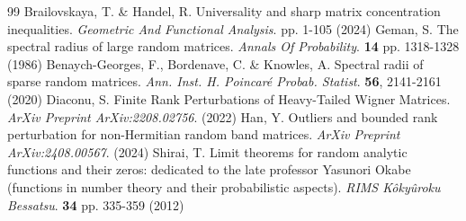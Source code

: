 \documentclass[12pt, reqno]{amsart}
\theoremstyle{definition}
\theoremstyle{remark}
\numberwithin{equation}{section}
\begin{document}
\begin{thebibliography}{99}
Brailovskaya, T. \& Handel, R. Universality and sharp matrix concentration inequalities. {\em Geometric And Functional Analysis}. pp. 1-105 (2024)
Geman, S. The spectral radius of large random matrices. {\em Annals Of Probability}. \textbf{14} pp. 1318-1328 (1986)
Benaych-Georges, F., Bordenave, C. \& Knowles, A. Spectral radii of sparse random matrices. {\em Ann. Inst. H. Poincaré Probab. Statist}. \textbf{56}, 2141-2161 (2020)
Diaconu, S. Finite Rank Perturbations of Heavy-Tailed Wigner Matrices. {\em ArXiv Preprint ArXiv:2208.02756}. (2022)
Han, Y. Outliers and bounded rank perturbation for non-Hermitian random band matrices. {\em ArXiv Preprint ArXiv:2408.00567}. (2024)
Shirai, T. Limit theorems for random analytic functions and their zeros: dedicated to the late professor Yasunori Okabe (functions in number theory and their probabilistic aspects). {\em RIMS Kôkyûroku Bessatsu}. \textbf{34} pp. 335-359 (2012)





\end{thebibliography}
\end{document}
